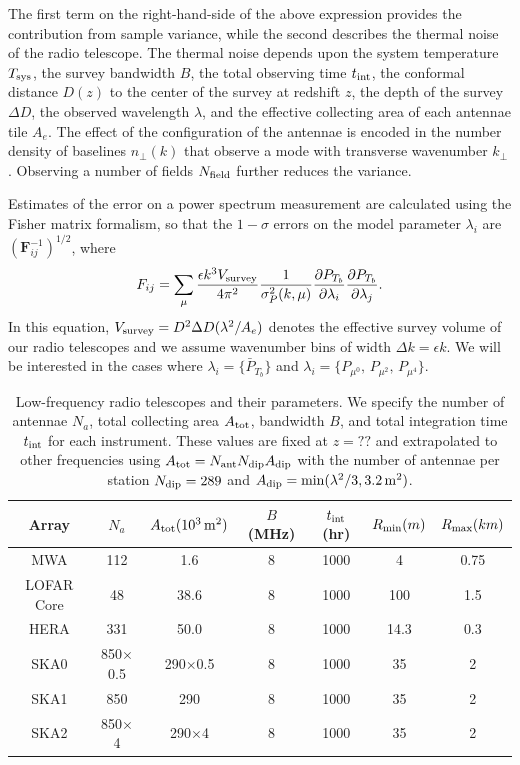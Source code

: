 \documentclass{PoS}
\begin{document}
The first term on the right-hand-side
of the above expression provides the contribution from sample variance,
while the second describes the thermal noise of the radio telescope.  The
thermal noise depends upon the system temperature $T_{\rm sys}$, the survey
bandwidth $B$, the total observing time $t_{\rm int}$, the conformal
distance $D(z)$ to the center of the survey at redshift $z$, the depth of
the survey $\Delta D$, the observed wavelength $\lambda$, and the effective
collecting area of each antennae tile $A_e$.  The effect of the
configuration of the antennae is encoded in the number density of baselines
$n_\perp(k)$ that observe a mode with transverse wavenumber $k_\perp$
\citep{2006ApJ...653..815M}.  Observing a number of fields $N_{\rm field}$ further reduces the variance.

Estimates of the error on a power spectrum measurement are calculated using the Fisher matrix formalism, so that the $1-\sigma$ errors on the model parameter $\lambda_i$ are $(\mathbf{F}_{ij}^{-1})^{1/2}$, where 
\begin{equation}
F_{ij}=\sum_{\rm \mu} \frac{\epsilon k^3 V_{\rm survey}}{4\pi^2}\frac{1}{\sigma_P^2(k,\mu)}\frac{\partial P_{T_b}}{\partial \lambda_i}\frac{\partial P_{T_b}}{\partial \lambda_j}.
\end{equation}
In this equation, $V_{\rm survey}=D^2\Delta D(\lambda^2/A_e)$ denotes the
effective survey volume of our radio telescopes and we assume wavenumber
bins of width $\Delta k=\epsilon k$.  We will be interested in the cases
where $\lambda_i=\{\bar{P}_{T_b}\}$ and $\lambda_i=\{
P_{\mu^0},\,P_{\mu^2},\,P_{\mu^4}\}$.

\begin{table}[htdp]
\caption{Low-frequency radio telescopes and their parameters.  We specify the number of antennae $N_a$, total collecting area $A_{\rm tot}$, bandwidth $B$, and total integration time $t_{\rm int}$ for each instrument. These values are fixed at $z=??$ and extrapolated to other frequencies using $A_{\rm tot}=N_{\rm ant}N_{\rm dip}A_{\rm dip}$ with the number of antennae per station $N_{\rm dip}=289$ and $A_{\rm dip}=\min(\lambda^2/3,3.2\,{ \rm m^2})$.}
\begin{center}
\begin{tabular}{ccccccc}
\hline
\hline
Array & $N_a$ & $A_{\rm tot}(10^3\,{\rm m^2})$ & $B$ (MHz) & $t_{\rm int}$ (hr)& $R_{\rm min} (m)$ & $R_{\rm max} (km)$\\
\hline
MWA & 112 & 1.6  & 8 & 1000 & 4 & 0.75\\
LOFAR Core & 48 & 38.6  & 8 & 1000 & 100 & 1.5\\
HERA & 331 & 50.0  & 8 & 1000 & 14.3 & 0.3\\
SKA0 & 850$\times$0.5 & 290$\times$0.5  & 8 & 1000 & 35 & 2\\
SKA1 & 850 & 290  & 8 & 1000 & 35 & 2\\
SKA2 & 850$\times$4 & 290$\times$4 & 8 & 1000 & 35 & 2\\
\hline
\hline
\end{tabular}
\end{center}
\label{tab:telescopes}
\end{table}%
\end{document}
